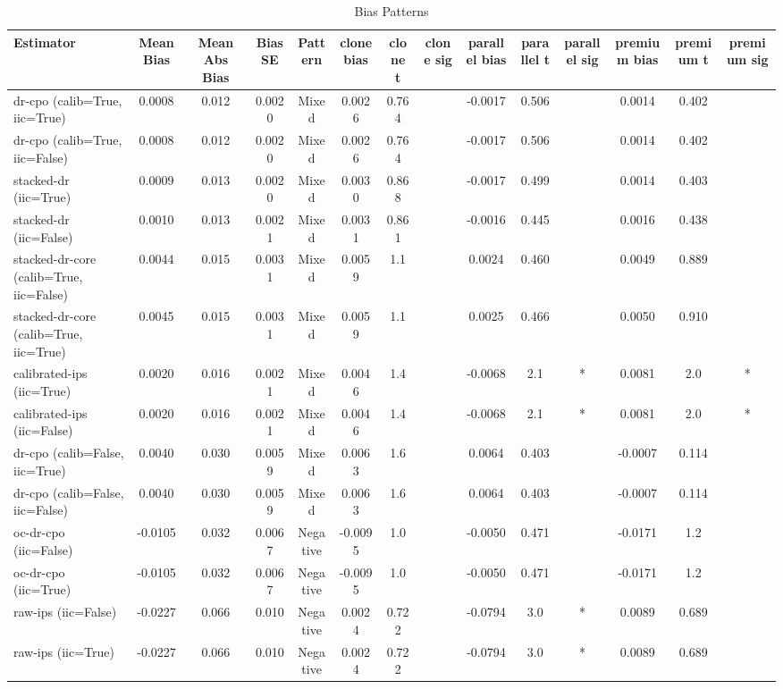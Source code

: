 \begin{table}[htbp]
\centering
\caption{Bias Patterns}
\label{tab:A2}
\begin{tabular}{l|ccccccccccccc}
\toprule
Estimator & Mean Bias & Mean Abs Bias & Bias SE & Pattern & clone bias & clone t & clone sig & parallel bias & parallel t & parallel sig & premium bias & premium t & premium sig \\
\midrule
dr-cpo (calib=True, iic=True) & 0.0008 & 0.012 & 0.0020 & Mixed & 0.0026 & 0.764 &  & -0.0017 & 0.506 &  & 0.0014 & 0.402 &  \\
dr-cpo (calib=True, iic=False) & 0.0008 & 0.012 & 0.0020 & Mixed & 0.0026 & 0.764 &  & -0.0017 & 0.506 &  & 0.0014 & 0.402 &  \\
stacked-dr (iic=True) & 0.0009 & 0.013 & 0.0020 & Mixed & 0.0030 & 0.868 &  & -0.0017 & 0.499 &  & 0.0014 & 0.403 &  \\
stacked-dr (iic=False) & 0.0010 & 0.013 & 0.0021 & Mixed & 0.0031 & 0.861 &  & -0.0016 & 0.445 &  & 0.0016 & 0.438 &  \\
stacked-dr-core (calib=True, iic=False) & 0.0044 & 0.015 & 0.0031 & Mixed & 0.0059 & 1.1 &  & 0.0024 & 0.460 &  & 0.0049 & 0.889 &  \\
stacked-dr-core (calib=True, iic=True) & 0.0045 & 0.015 & 0.0031 & Mixed & 0.0059 & 1.1 &  & 0.0025 & 0.466 &  & 0.0050 & 0.910 &  \\
calibrated-ips (iic=True) & 0.0020 & 0.016 & 0.0021 & Mixed & 0.0046 & 1.4 &  & -0.0068 & 2.1 & * & 0.0081 & 2.0 & * \\
calibrated-ips (iic=False) & 0.0020 & 0.016 & 0.0021 & Mixed & 0.0046 & 1.4 &  & -0.0068 & 2.1 & * & 0.0081 & 2.0 & * \\
dr-cpo (calib=False, iic=True) & 0.0040 & 0.030 & 0.0059 & Mixed & 0.0063 & 1.6 &  & 0.0064 & 0.403 &  & -0.0007 & 0.114 &  \\
dr-cpo (calib=False, iic=False) & 0.0040 & 0.030 & 0.0059 & Mixed & 0.0063 & 1.6 &  & 0.0064 & 0.403 &  & -0.0007 & 0.114 &  \\
oc-dr-cpo (iic=False) & -0.0105 & 0.032 & 0.0067 & Negative & -0.0095 & 1.0 &  & -0.0050 & 0.471 &  & -0.0171 & 1.2 &  \\
oc-dr-cpo (iic=True) & -0.0105 & 0.032 & 0.0067 & Negative & -0.0095 & 1.0 &  & -0.0050 & 0.471 &  & -0.0171 & 1.2 &  \\
raw-ips (iic=False) & -0.0227 & 0.066 & 0.010 & Negative & 0.0024 & 0.722 &  & -0.0794 & 3.0 & * & 0.0089 & 0.689 &  \\
raw-ips (iic=True) & -0.0227 & 0.066 & 0.010 & Negative & 0.0024 & 0.722 &  & -0.0794 & 3.0 & * & 0.0089 & 0.689 &  \\

\end{tabular}
\end{table}
